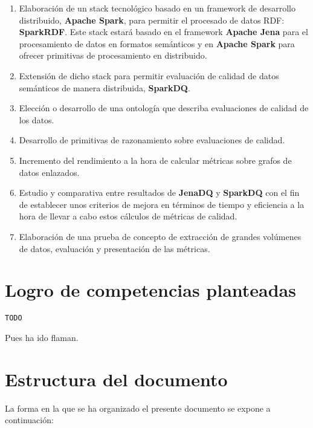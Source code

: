 \begin{enumerate}
  \item Elaboración de un stack tecnológico basado en un framework de desarrollo
    distribuido, \textbf{Apache Spark}, para permitir el procesado de datos RDF:
    \textbf{SparkRDF}. Este stack estará basado en el framework \textbf{Apache
      Jena} para el procesamiento de datos en formatos semánticos y en
    \textbf{Apache Spark} para ofrecer primitivas de procesamiento en
    distribuido.
  \item Extensión de dicho stack para permitir evaluación de calidad de datos
    semánticos de manera distribuida, \textbf{SparkDQ}.
  \item Elección o desarrollo de una ontología que describa evaluaciones de
    calidad de los datos.
  \item Desarrollo de primitivas de razonamiento sobre evaluaciones de
    calidad.
  \item Incremento del rendimiento a la hora de calcular métricas sobre
    grafos de datos enlazados.
  \item Estudio y comparativa entre resultados de \textbf{JenaDQ} y
    \textbf{SparkDQ} con el fin de establecer unos criterios de mejora
    en términos de tiempo y eficiencia a la hora de llevar a cabo
    estos cálculos de métricas de calidad.
  \item Elaboración de una prueba de concepto de extracción de
    grandes volúmenes de datos, evaluación y presentación de las
    métricas.
\end{enumerate}



\section{Logro de competencias planteadas}

\texttt{TODO}

Pues ha ido flaman.

\section{Estructura del documento}

La forma en la que se ha organizado el presente documento se expone a
continuación: 

